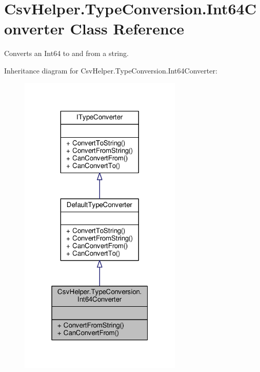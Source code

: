 \hypertarget{a00116}{\section{Csv\-Helper.\-Type\-Conversion.\-Int64\-Converter Class Reference}
\label{a00116}
}


Converts an Int64 to and from a string.  




Inheritance diagram for Csv\-Helper.\-Type\-Conversion.\-Int64\-Converter\-:
\nopagebreak
\begin{figure}[H]
\begin{center}
\leavevmode
\includegraphics[width=220pt]{a00522}
\end{center}
\end{figure}


